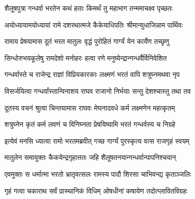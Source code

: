 
\translink{}

\storymeta



\twolineshloka
{शैलूषपुत्रा गन्धर्वा भरतेन कथं हताः}
{किमर्थं तु महाभाग तन्ममाचक्ष्व पृच्छतः}%


\twolineshloka
{अयोध्यायामयोध्यायां रामे दशरथात्मजे}
{कैकेयाधिपतिः श्रीमान्युधाजिन्नाम पार्थिवः}%

\twolineshloka
{रामाय प्रेषयामास दूतं भरत मातुलः}
{वृद्धं पुरोहितं गार्ग्यं येन कार्येण तच्छृणु}%

\twolineshloka
{सिन्धोरुभयकूलेषु रामदेशो मनोहरः}
{हत्वा रणे मनुष्येन्द्रान्गन्धर्वैर्विनिवेशित}%

\twolineshloka
{गन्धर्वास्ते च राजेन्द्र राज्ञां विप्रियकारकाः}
{लक्ष्मणं भरतं वापि शत्रुघ्नमथवा नृप}%

\twolineshloka
{विसर्जयित्वा गन्धर्वांस्तान्विनाशय राघव}
{राजानो निर्भयाः सन्तु देशश्चास्तु तथा तव}%

\twolineshloka
{दूतस्य वचनं श्रुत्वा चिन्तयामास राघवः}
{मेघनादवधे कर्म लक्ष्मणेन महत्कृतम्}%

\twolineshloka
{शत्रुघ्नेन कृतं कर्म लवणं च विनिघ्नता}
{प्रेषयिष्यामि भरतं गन्धर्वस्य च निग्रहे}%

\twolineshloka
{इत्येवं मनसि ध्यात्वा रामो भरतमब्रवीत्}
{गच्छ गार्ग्यं पुरस्कृत्य वत्स राजगृहं स्वयम्}%

\twolineshloka
{मातुलेन समायुक्तः कैकयेन्द्रगृहात्ततः}
{जहि शैलूषतनयान्गन्धर्वान्पापनिश्चयान्}%

\twolineshloka
{एवमुक्तः स धर्मात्मा भरतो भ्रातृवत्सलः}
{रामस्य पादौ शिरसा चाभिवन्द्य कृताञ्जलिः}%

\twolineshloka
{गृहं गत्वा चकाराथ सर्वं प्रास्थानिकं विधिम्}
{ओषधीनां कषायेण तदोत्प्लावितविग्रहः}%

